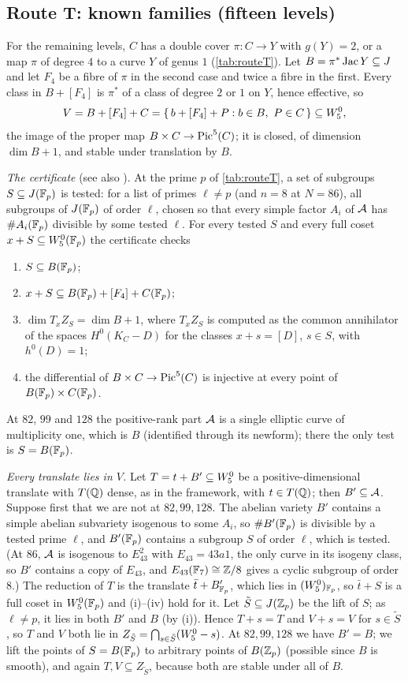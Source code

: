 \subsection{Route T: known families (fifteen levels)}
For the remaining levels, $C$ has a double cover $\pi\colon C\to Y$ with $g(Y)=2$, or a map $\pi$ of degree $4$ to
a curve $Y$ of genus $1$ (\cref{tab:routeT}). Let $B=\pi^*\operatorname{Jac} Y\subseteq J$ and let $F_4$ be a fibre of $\pi$ in the
second case and twice a fibre in the first. Every class in $B+[F_4]$ is $\pi^*$ of a class of degree $2$ or $1$ on
$Y$, hence effective, so
\[
 V=B+[F_4]+C=\{\,b+[F_4]+P: b\in B,\ P\in C\,\}\subseteq W^0_5 ,
\]
the image of the proper map $B\times C\to\operatorname{Pic}^5(C)$; it is closed, of dimension $\dim B+1$, and stable under
translation by $B$.

\emph{The certificate} (see also \cite{SuppA}). At the prime $p$ of \cref{tab:routeT}, a set of subgroups $S\subseteq J(\mathbb{F}_p)$ is tested: for
a list of primes $\ell\ne p$ (and $n=8$ at $N=86$), all subgroups of $J(\mathbb{F}_p)$ of order $\ell$, chosen so that every
simple factor $A_i$ of $\mathcal{A}$ has $\#A_i(\mathbb{F}_p)$ divisible by some tested $\ell$. For every tested $S$ and every full
coset $x+S\subseteq W^0_5(\mathbb{F}_p)$ the certificate checks
\begin{enumerate}
\item[(i)] $S\subseteq B(\mathbb{F}_p)$;
\item[(ii)] $x+S\subseteq B(\mathbb{F}_p)+[F_4]+C(\mathbb{F}_p)$;
\item[(iii)] $\dim T_xZ_S=\dim B+1$, where $T_xZ_S$ is computed as the common annihilator of the spaces
 $H^0(K_C-D)$ for the classes $x+s=[D]$, $s\in S$, with $h^0(D)=1$;
\item[(iv)] the differential of $B\times C\to\operatorname{Pic}^5(C)$ is injective at every point of $B(\mathbb{F}_p)\times C(\mathbb{F}_p)$.
\end{enumerate}
At $82$, $99$ and $128$ the positive-rank part $\mathcal{A}$ is a single elliptic curve of multiplicity one, which is $B$
(identified through its newform); there the only test is $S=B(\mathbb{F}_p)$.

\emph{Every translate lies in $V$.} Let $T=t+B'\subseteq W^0_5$ be a positive-dimensional translate with $T(\mathbb{Q})$ dense,
as in the framework, with $t\in T(\mathbb{Q})$; then $B'\subseteq\mathcal{A}$. Suppose first that we are not at $82,99,128$.
The abelian variety $B'$ contains a simple abelian subvariety isogenous to some $A_i$, so $\#B'(\mathbb{F}_p)$ is divisible by
a tested prime $\ell$, and $B'(\mathbb{F}_p)$ contains a subgroup $S$ of order $\ell$, which is tested. (At $86$, $\mathcal{A}$ is
isogenous to $E_{43}^2$ with $E_{43}=43a1$, the only curve in its isogeny class, so $B'$ contains a copy of $E_{43}$,
and $E_{43}(\mathbb{F}_7)\cong\mathbb{Z}/8$ gives a cyclic subgroup of order $8$.) The reduction of $T$ is the translate
$\bar t+B'_{\mathbb{F}_p}$, which lies in $(W^0_5)_{\mathbb{F}_p}$, so $\bar t+S$ is a full coset in $W^0_5(\mathbb{F}_p)$ and (i)--(iv) hold for it.
Let $\tilde S\subseteq J(\mathbb{Z}_p)$ be the lift of $S$; as $\ell\ne p$, it lies in both $B'$ and $B$ (by (i)). Hence
$T+s=T$ and $V+s=V$ for $s\in\tilde S$, so $T$ and $V$ both lie in $Z_{\tilde S}=\bigcap_{s\in\tilde S}(W^0_5-s)$. At
$82,99,128$ we have $B'=B$; we lift the points of $S=B(\mathbb{F}_p)$ to arbitrary points of $B(\mathbb{Z}_p)$ (possible since $B$ is
smooth), and again $T,V\subseteq Z_{\tilde S}$, because both are stable under all of $B$.

